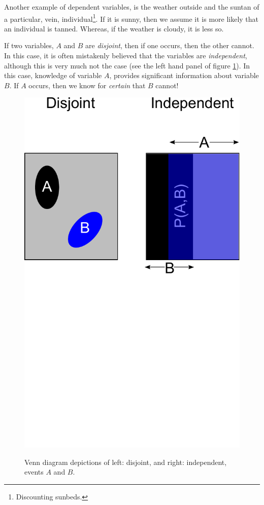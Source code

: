 \documentclass[11pt,fullpage]{book}
\begin{document}
Another example of dependent variables, is the weather outside and the suntan of a particular, vein, individual\footnote{Discounting sunbeds.}. If it is sunny, then we assume it is more likely that an individual is tanned. Whereas, if the weather is cloudy, it is less so.

If two variables, $A$ and $B$ are \textit{disjoint}, then if one occurs, then the other cannot. In this case, it is often mistakenly believed that the variables are \textit{independent}, although this is very much not the case (see the left hand panel of figure \ref{fig:Intro_VennIndependence}). In this case, knowledge of variable $A$, provides significant information about variable $B$. If $A$ occurs, then we know for \textit{certain} that $B$ cannot!

\begin{figure}
\centering
\scalebox{0.4} 
{\includegraphics{Intro_VennIndependence.pdf}}
\caption{Venn diagram depictions of left: disjoint, and right: independent, events $A$ and $B$.}\label{fig:Intro_VennIndependence}
\end{figure}
\end{document}
